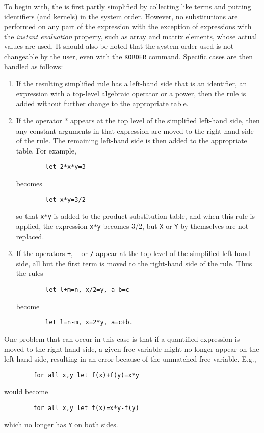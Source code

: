 To begin with, the {\tt <substitution expression>} is first partly
simplified by collecting like terms and putting identifiers (and kernels)
in the system order.  However, no substitutions are performed on any part
of the expression with the exception of expressions with the {\em instant
evaluation\/} property, such as array and matrix elements, whose actual
values are used.  It should also be noted that the system order used is
not changeable by the user, even with the {\tt KORDER} command.  Specific
cases are then handled as follows:
\begin{enumerate}
\item If the resulting simplified rule has a left-hand side that is an
identifier, an expression with a top-level algebraic operator or a power,
then the rule is added without further change to the appropriate table.

\item If the operator * appears at the top level of the simplified left-hand
side, then any constant arguments in that expression are moved to the
right-hand side of the rule.  The remaining left-hand side is then added
to the appropriate table.  For example,
\begin{verbatim}
        let 2*x*y=3
\end{verbatim}
becomes
\begin{verbatim}
        let x*y=3/2
\end{verbatim}
so that {\tt x*y} is added to the product substitution table, and when
this rule is applied, the expression {\tt x*y} becomes 3/2, but {\tt X} or
{\tt Y} by themselves are not replaced.

\item If the operators {\tt +}, {\tt -} or {\tt /} appear at the top level
of the simplified left-hand side, all but the first term is moved to the
right-hand side of the rule.  Thus the rules
\begin{verbatim}
        let l+m=n, x/2=y, a-b=c
\end{verbatim}
become
\begin{verbatim}
        let l=n-m, x=2*y, a=c+b.
\end{verbatim}
\end{enumerate}
One problem that can occur in this case is that if a quantified expression
is moved to the right-hand side, a given free variable might no longer
appear on the left-hand side, resulting in an error because of the
unmatched free variable. E.g.,
\begin{verbatim}
        for all x,y let f(x)+f(y)=x*y
\end{verbatim}
would become
\begin{verbatim}
        for all x,y let f(x)=x*y-f(y)
\end{verbatim}
which no longer has {\tt Y} on both sides.

